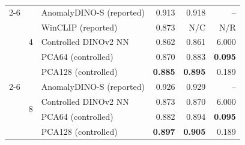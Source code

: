 \begin{table}[pos=t]
\begin{tabular}{lllrrr}
\cmidrule(lr){2-6}
& \multirow{5}{*}{4} & AnomalyDINO-S (reported) & 0.913 & 0.918 & -- \\
& & WinCLIP (reported) & 0.873 & N/C & N/R \\
& & Controlled DINOv2 NN & 0.862 & 0.861 & 6.000 \\
& & PCA64 (controlled) & 0.870 & 0.883 & \textbf{0.095} \\
& & PCA128 (controlled) & \textbf{0.885} & \textbf{0.895} & 0.189 \\
\cmidrule(lr){2-6}
& \multirow{4}{*}{8} & AnomalyDINO-S (reported) & 0.926 & 0.929 & -- \\
& & Controlled DINOv2 NN & 0.873 & 0.870 & 6.000 \\
& & PCA64 (controlled) & 0.882 & 0.894 & \textbf{0.095} \\
& & PCA128 (controlled) & \textbf{0.897} & \textbf{0.905} & 0.189 \\
\bottomrule
\end{tabular}
\end{table}
